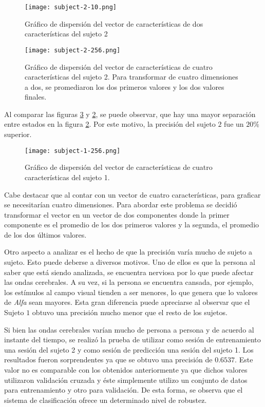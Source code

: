  \begin{figure}[H]
	\centering
    \texttt{[image: subject-2-10.png]}
    \caption{Gráfico de dispersión del vector de características de dos características del sujeto 2}
	\label{fig:subject-2-10}
\end{figure}

 \begin{figure}[H]
	\centering
    \texttt{[image: subject-2-256.png]}
    \caption{Gráfico de dispersión del vector de características de cuatro características del sujeto 2. Para transformar de cuatro dimensiones a dos, se promediaron los dos primeros valores y los dos valores finales.}
	\label{fig:subject-2-256}
\end{figure}


Al comparar las figuras \ref{fig:subject-1-256} y \ref{fig:subject-2-256}, se puede observar, que hay una mayor separación entre estados en la figura \ref{fig:subject-2-256}. Por este motivo, la precisión del sujeto $2$ fue un $20\%$ superior.

 \begin{figure}[H]
	\centering
    \texttt{[image: subject-1-256.png]}
    \caption{Gráfico de dispersión del vector de características de cuatro características del sujeto 1.}
	\label{fig:subject-1-256}
\end{figure}

Cabe destacar que al contar con un vector de cuatro características, para graficar se necesitarían cuatro dimensiones. Para abordar este problema se decidió transformar el vector en un vector de dos componentes donde la primer componente es el promedio de los dos primeros valores y la segunda, el promedio de los dos últimos valores.

Otro aspecto a analizar es el hecho de que la precisión varía mucho de sujeto a sujeto. Esto puede deberse a diversos motivos. Uno de ellos es que la persona al saber que está siendo analizada, se encuentra nerviosa por lo que puede afectar las ondas cerebrales. A su vez, si la persona se encuentra cansada, por ejemplo, los estímulos al campo visual tienden a ser menores, lo que genera que lo valores de \emph{Alfa} sean mayores. Esta gran diferencia puede apreciarse al observar que el Sujeto $1$ obtuvo una precisión mucho menor que el resto de los sujetos.

Si bien las ondas cerebrales varían mucho de persona a persona y de acuerdo al instante del tiempo, se realizó la prueba de utilizar como sesión de entrenamiento una sesión del sujeto 2  y como sesión de predicción una sesión del sujeto 1. Los resultados fueron sorprendentes ya que se obtuvo una precisión de $0.6537$. Este valor no es comparable con los obtenidos anteriormente ya que dichos valores utilizaron validación cruzada y éste simplemente utilizo un conjunto de datos para entrenamiento y otro para validación. De esta forma, se observa que el sistema de clasificación ofrece un determinado nivel de robustez.


